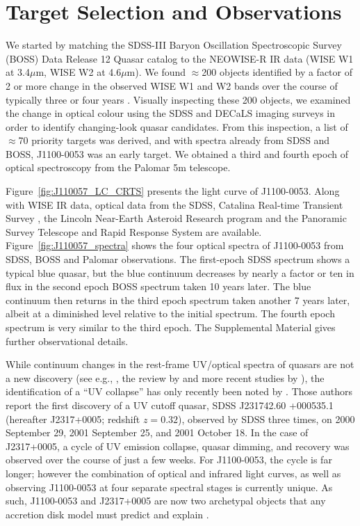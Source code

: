 \documentclass{nature}
\begin{document}
\section{Target Selection and Observations}  
We started by matching the SDSS-III Baryon Oscillation Spectroscopic
Survey (BOSS) Data Release 12 Quasar catalog \cite[DR12Q;
][]{Paris2017} to the NEOWISE-R IR data (WISE W1 at 3.4$\mu$m, WISE W2
at 4.6$\mu$m). We found $\approx$200 objects identified by a factor of 2
or more change in the observed WISE W1 and W2 bands over the course of
typically three or four years \citep[see][and the Supplemental
Material for the detailed NEOWISE-R selection]{Meisner2017b}. Visually
inspecting these 200 objects, we examined the change in optical colour
using the SDSS and DECaLS imaging surveys in order to identify
changing-look quasar candidates.  From this inspection, a list of
$\approx$70 priority targets was derived, and with spectra already
from SDSS and BOSS, J1100-0053 was an early target. We obtained a
third and fourth epoch of optical spectroscopy from the Palomar 5m
telescope.

Figure~\ref{fig:J110057_LC_CRTS} presents the light curve of
J1100-0053.  Along with WISE IR data, optical data from the SDSS,
Catalina Real-time Transient Survey \citep[CRTS;][]{Drake2009,
Mahabal2011}, the Lincoln Near-Earth Asteroid Research \citep[LINEAR;
][]{Sesar2011} program and the Panoramic Survey Telescope and Rapid
Response System \citep[PanSTARRS;][]{Kaiser2010, Stubbs2010,
Tonry2012, Magnier2013} are
available. Figure~\ref{fig:J110057_spectra} shows the four optical
spectra of J1100-0053 from SDSS, BOSS and Palomar observations.  The
first-epoch SDSS spectrum shows a typical blue quasar, but the blue
continuum decreases by nearly a factor or ten in flux in the second
epoch BOSS spectrum taken 10 years later. The blue continuum then
returns in the third epoch spectrum taken another 7 years later,
albeit at a diminished level relative to the initial spectrum. The
fourth epoch spectrum is very similar to the third epoch.  The
Supplemental Material gives further observational details.

While continuum changes in the rest-frame UV/optical spectra of
quasars are not a new discovery (see e.g., \cite{Clavel1991}, the
review by \cite{Ulrich1997} and more recent studies by
\cite{VandenBerk2004, Pereyra2006, MacLeod2010, Guo2016b}), the
identification of a ``UV collapse'' has only recently been noted by
\cite{Guo2016}.  Those authors report the first discovery of a UV
cutoff quasar, SDSS J231742.60 +000535.1 (hereafter J2317+0005;
redshift $z = 0.32$), observed by SDSS three times, on 2000 September
29, 2001 September 25, and 2001 October 18. In the case of J2317+0005,
a cycle of UV emission collapse, quasar dimming, and recovery was
observed over the course of just a few weeks. For J1100-0053, the
cycle is far longer; however the combination of optical and infrared
light curves, as well as observing J1100-0053 at four separate
spectral stages is currently unique. As such, J1100-0053 and
J2317+0005 are now two archetypal objects that any accretion disk
model must predict and explain \cite{Lawrence2018}.
\end{document}
